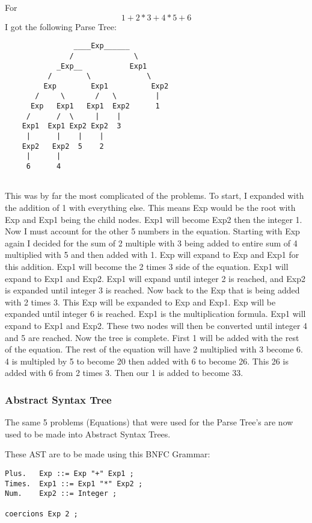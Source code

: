 \documentclass{article}
\theoremstyle{theorem}
\theoremstyle{definition}
\theoremstyle{remark}
\begin{document}
\noindent\newline\newline For $$1+2*3+4*5+6$$ I got the following Parse Tree:
\begin{verbatim}
                ____Exp______
               /              \
            _Exp__           Exp1
          /        \             \
         Exp        Exp1          Exp2
       /     \       /   \         |
      Exp   Exp1   Exp1  Exp2      1
     /      /  \     |    |
    Exp1  Exp1 Exp2 Exp2  3
     |      |    |    |
    Exp2   Exp2  5    2  
     |      |
     6      4
    
\end{verbatim}
\noindent\newline This was by far the most complicated of the problems. To start, I expanded with the addition of 1 with everything else. This means Exp would be the root with Exp and Exp1 being the child nodes. Exp1 will become Exp2 then the integer 1. Now I must account for the other 5 numbers in the equation. Starting with Exp again I decided for the sum of 2 multiple with 3 being added to entire sum of 4 multiplied with 5 and then added with 1. Exp will expand to Exp and Exp1 for this addition. Exp1 will become the 2 times 3 side of the equation. Exp1 will expand to Exp1 and Exp2. Exp1 will expand until integer 2 is reached, and Exp2 is expanded until integer 3 is reached. Now back to the Exp that is being added with 2 times 3. This Exp will be expanded to Exp and Exp1. Exp will be expanded until integer 6 is reached. Exp1 is the multiplication formula. Exp1 will expand to Exp1 and Exp2. These two nodes will then be converted until integer 4 and 5 are reached. Now the tree is complete. First 1 will be added with the rest of the equation. The rest of the equation will have 2 multiplied with 3 become 6. 4 is multipled by 5 to become 20 then added with 6 to become 26. This 26 is added with 6 from 2 times 3. Then our 1 is added to become 33.

\subsubsection{Abstract Syntax Tree} The same 5 problems (Equations) that were used for the Parse Tree's are now used to be made into Abstract Syntax Trees.

\noindent\newline\newline These AST are to be made using this BNFC Grammar:
\begin{verbatim}
Plus.   Exp ::= Exp "+" Exp1 ;
Times.  Exp1 ::= Exp1 "*" Exp2 ;
Num.    Exp2 ::= Integer ;

coercions Exp 2 ;
\end{verbatim}
\end{document}
